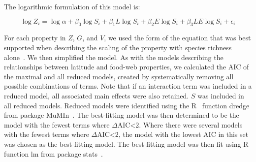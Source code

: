 \documentclass[12pt]{article}
\begin{document}
The logarithmic formulation of this model is:

\begin{equation}
\label{LogLat}
\log{Z_{i}} = \log{\alpha}+\beta_{0}\log{S_{i}} + \beta_{1}L\log{S_{i}} +\beta_{2}E\log{S_{i}} +\beta_{3}LE\log{S_{i}} +\epsilon_{i}
\end{equation}

For each property in $Z$, $G$, and $V$, we used the form of the equation that was best supported
when describing the scaling of the property with species richness alone~\citep{Xiao2011}.
We then simplified the model. As with the models describing the relationships between latitude and food-web
properties, we calculated the AIC of the maximal and all reduced models, created by systematically removing
all possible combinations of terms. Note that if an interaction term was included in a reduced model, all
associated main effects were also retained. $S$ was included in all reduced models. Reduced models were
identified using the R~\citep{R} function dredge from package MuMIn~\citep{MuMIn}. The best-fitting model
was then determined to be the model with the fewest terms where $\Delta$AIC<2. Where there were several
models with the fewest terms where $\Delta$AIC<2, the model with the lowest AIC in this set was chosen as
the best-fitting model. The best-fitting model was then fit using R~\citep{R} function lm from package stats~\citep{stats}.

\end{document}
